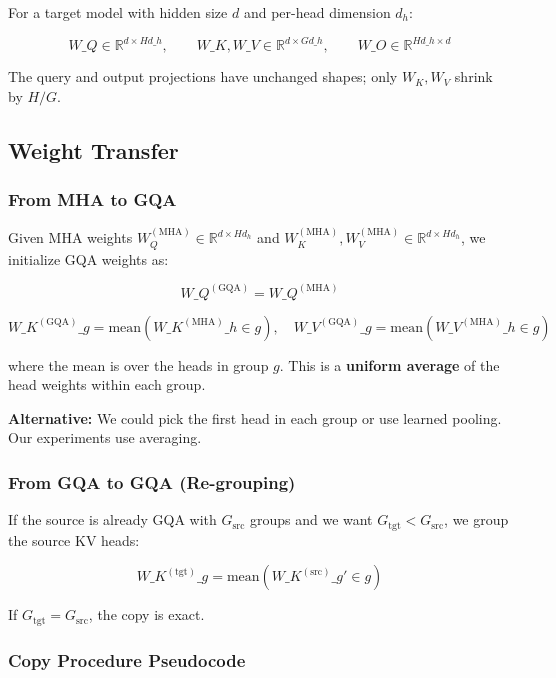 For a target model with hidden size $d$ and per-head dimension $d_h$:

\[
W\_Q \in \mathbb{R}^{d \times H d\_h}, \qquad
W\_K, W\_V \in \mathbb{R}^{d \times G d\_h}, \qquad
W\_O \in \mathbb{R}^{H d\_h \times d}
\tag{4.1}
\]

The query and output projections have unchanged shapes; only $W_K, W_V$ 
shrink by $H / G$.

\subsection{Weight Transfer}

\subsubsection{From MHA to GQA}

Given MHA weights $W_Q^{(\text{MHA})} \in \mathbb{R}^{d \times H d_h}$ and 
$W_K^{(\text{MHA})}, W_V^{(\text{MHA})} \in \mathbb{R}^{d \times H d_h}$, we 
initialize GQA weights as:

\[
W\_Q^{(\text{GQA})} = W\_Q^{(\text{MHA})}
\tag{4.2}
\]

\[
W\_K^{(\text{GQA})}\_g = \text{mean}\!\left(W\_K^{(\text{MHA})}\_{h \in g}\right), \quad
W\_V^{(\text{GQA})}\_g = \text{mean}\!\left(W\_V^{(\text{MHA})}\_{h \in g}\right)
\tag{4.3}
\]

where the mean is over the heads in group $g$. This is a \textbf{uniform average} 
of the head weights within each group.

\textbf{Alternative:} We could pick the first head in each group or use learned 
pooling. Our experiments use averaging.

\subsubsection{From GQA to GQA (Re-grouping)}

If the source is already GQA with $G_\text{src}$ groups and we want 
$G_\text{tgt} < G_\text{src}$, we group the source KV heads:

\[
W\_K^{(\text{tgt})}\_g = \text{mean}\!\left(W\_K^{(\text{src})}\_{g' \in g}\right)
\tag{4.4}
\]

If $G_\text{tgt} = G_\text{src}$, the copy is exact.

\subsubsection{Copy Procedure Pseudocode}

